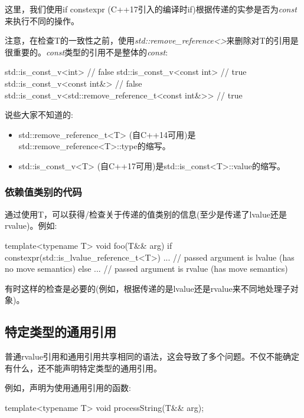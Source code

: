 这里，我们使用if constexpr (C++17引入的编译时if)根据传递的实参是否为\textit{const}来执行不同的操作。

注意，在检查T的一致性之前，使用\textit{std::remove_reference<>}来删除对T的引用是很重要的。\textit{const}类型的引用不是整体的\textit{const}:

\begin{cppcode}
std::is_const_v<int> // false
std::is_const_v<const int> // true
std::is_const_v<const int&> // false
std::is_const_v<std::remove_reference_t<const int&>> // true
\end{cppcode}

说些大家不知道的:

\begin{itemize}
	\item std::remove_reference_t<T> (自C++14可用)是std::remove_reference<T>::type的缩写。
	\item std::is_const_v<T> (自C++17可用)是std::is_const<T>::value的缩写。
\end{itemize}

\subsubsection{依赖值类别的代码}

通过使用T，可以获得/检查关于传递的值类别的信息(至少是传递了lvalue还是rvalue)。例如:

\begin{cppcode}
template<typename T>
void foo(T&& arg)
{
	if constexpr(std::is_lvalue_reference_t<T>) {
		... // passed argument is lvalue (has no move semantics)
	}
	else {
		... // passed argument is rvalue (has move semantics)
	}
}
\end{cppcode}

有时这样的检查是必要的(例如，根据传递的是lvalue还是rvalue来不同地处理子对象)。

\subsection{特定类型的通用引用}

普通rvalue引用和通用引用共享相同的语法，这会导致了多个问题。不仅不能确定有什么，还不能声明特定类型的通用引用。

例如，声明为使用通用引用的函数:

\begin{cppcode}
template<typename T>
void processString(T&& arg);
\end{cppcode}


